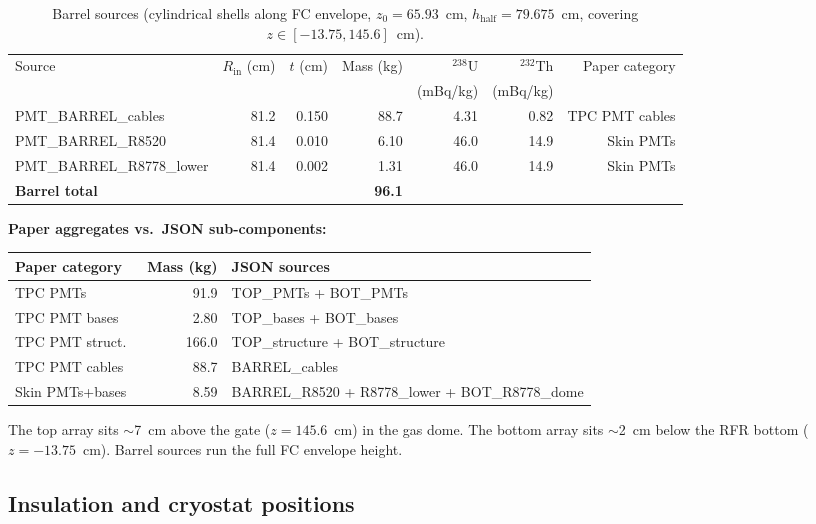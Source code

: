 \documentclass[11pt]{article}
\begin{document}
\begin{table}[h]
\centering
\caption{Barrel sources (cylindrical shells along FC envelope,
  $z_0 = 65.93$~cm, $h_\text{half} = 79.675$~cm, covering
  $z \in [-13.75, 145.6]$~cm).}
\label{tab:pmt_barrel}
\small
\begin{tabular}{@{}lrrrrrr@{}}
\toprule
{Source} & {$R_\text{in}$ (cm)} & {$t$ (cm)} & {Mass (kg)} &
  {$^{238}$U} & {$^{232}$Th} & {Paper category} \\
 & & & & {(mBq/kg)} & {(mBq/kg)} & \\
\midrule
PMT\_BARREL\_cables      & 81.2 & 0.150 & 88.7 & 4.31 & 0.82 & TPC PMT cables \\
PMT\_BARREL\_R8520       & 81.4 & 0.010 &  6.10 & 46.0 & 14.9 & Skin PMTs \\
PMT\_BARREL\_R8778\_lower & 81.4 & 0.002 &  1.31 & 46.0 & 14.9 & Skin PMTs \\
\midrule
\textbf{Barrel total}    &      &       & \textbf{96.1} & & & \\
\bottomrule
\end{tabular}
\end{table}

\noindent\textbf{Paper aggregates vs.\ JSON sub-components:}

\begin{tabular}{@{}lrl@{}}
\toprule
Paper category & Mass (kg) & JSON sources \\
\midrule
TPC PMTs       & 91.9  & TOP\_PMTs + BOT\_PMTs \\
TPC PMT bases  &  2.80 & TOP\_bases + BOT\_bases \\
TPC PMT struct.\ & 166.0 & TOP\_structure + BOT\_structure \\
TPC PMT cables & 88.7  & BARREL\_cables \\
Skin PMTs+bases &  8.59 & BARREL\_R8520 + R8778\_lower + BOT\_R8778\_dome \\
\bottomrule
\end{tabular}
\vspace{6pt}

The top array sits $\sim$7~cm above the gate ($z = 145.6$~cm) in
the gas dome.  The bottom array sits $\sim$2~cm below the RFR bottom
($z = -13.75$~cm).  Barrel sources run the full FC envelope height.

\subsection{Insulation and cryostat positions}
\end{document}
